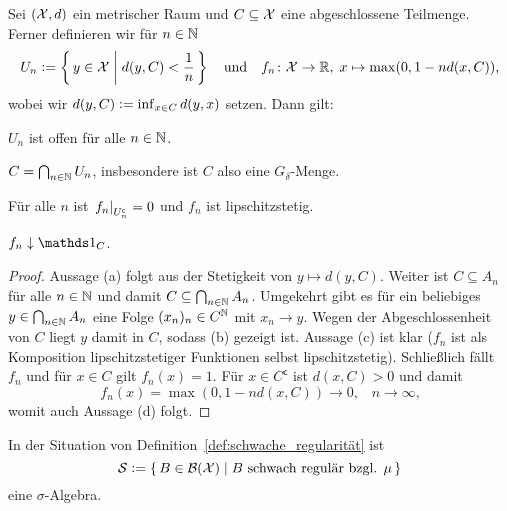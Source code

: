 \documentclass[../thesis/thesis.tex]{subfiles}
\begin{document}
	\begin{Hilfssatz}
		\label{hilfssatz:offene_mengen}
		Sei $(\mathcal{X}, d)$ ein metrischer Raum und $C \subseteq \mathcal{X}$ eine abgeschlossene 
		Teilmenge. Ferner definieren wir für $n \in \mathbb{N}$
		$$ U_n \vcentcolon = \left\{\, y \in \mathcal{X} \; \middle| \; d(y, C) < \frac{1}{n} \,\right\} \quad \text{und} \quad 
		f_n \colon \mathcal{X} \to \mathbb{R}, \; x \mapsto \max (0, 1-n d(x, C))  \text{,}$$
		wobei wir $d(y, C) \vcentcolon = \inf_{x \in C} d(y, x)$ setzen.
		Dann gilt:
		\begin{enumeratethm}
			\item $U_n$ ist offen für alle $n \in \mathbb{N}$.
			\item $C = \bigcap_{n \in \mathbb{N}} U_n$, insbesondere ist $C$ also eine $G_\delta$-Menge.
			\item Für alle $n$ ist $\left.f_n\right|_{U_n^\mathsf{c}} = 0$ und $f_n$ ist lipschitzstetig.
			\item $f_n \convdown \indfct_C$.
		\end{enumeratethm}
	\end{Hilfssatz}
	
	\begin{proof}
		Aussage (a) folgt aus der Stetigkeit von $y \mapsto d(y, C)$.
		Weiter ist $C \subseteq A_n$ für alle $n \in \mathbb{N}$ und damit 
		$C \subseteq \bigcap_{n \in \mathbb{N}} A_n$. 
		Umgekehrt gibt es für ein beliebiges $y \in \bigcap_{n \in \mathbb{N}} A_n$
		eine Folge $(x_n)_n \in C^{\mathbb{N}}$ mit $x_n \rightarrow y$. 
		Wegen der Abgeschlossenheit von $C$ liegt $y$ damit in $C$, sodass (b) gezeigt ist.
		Aussage (c) ist klar ($f_n$ ist als Komposition 
		lipschitzstetiger Funktionen selbst lipschitzstetig).
		Schließlich fällt $f_n$ und für $x \in C$ gilt $f_n(x) = 1$. 
		Für $x \in C^\mathsf{c}$ ist $d(x, C) > 0$ und damit
		$$f_n(x) = \max (0, 1-n d(x, C))
		\to 0 \text{,} \quad n \to \infty \text{,}$$
		womit auch Aussage (d) folgt.
	\end{proof}
	
	\begin{Hilfssatz}
		\label{hilfssatz:schwach_reguläre_mengen_sigma_algebra}
		In der Situation von Definition~\ref{def:schwache_regularität} ist
		$$\mathcal{S} \vcentcolon = \left\{\, B \in \mathcal{B}(\mathcal{X}) \; \middle| \; B \text{ schwach regulär bzgl. } \mu \,\right\}$$
		eine $\sigma$-Algebra.
	\end{Hilfssatz}
	
\end{document}
